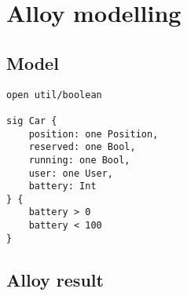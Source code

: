 \chapter{Alloy modelling}

\section{Model}
\begin{verbatim}
open util/boolean

sig Car {
	position: one Position,
	reserved: one Bool,
	running: one Bool,
	user: one User,
	battery: Int
} {
	battery > 0
	battery < 100
}
\end{verbatim}

\section{Alloy result}
